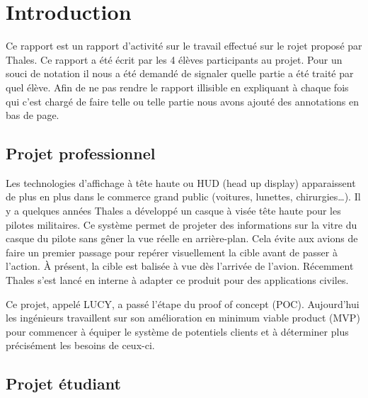 
\chapter{Introduction} %

\label{Chapter1} %


\color{red}

Ce rapport est un rapport d’activité sur le travail effectué sur le rojet proposé par Thales. Ce
rapport a été écrit par les 4 élèves participants au projet. Pour un souci de notation il nous a été
demandé de signaler quelle partie a été traité par quel élève. Afin de ne pas rendre le rapport
illisible en expliquant à chaque fois qui c’est chargé de faire telle ou telle partie nous avons ajouté
des annotations en bas de page.

\color{black}

\section{Projet professionnel}

Les technologies d’affichage à tête haute ou HUD (head up display) apparaissent de plus en plus dans le
commerce grand public (voitures, lunettes, chirurgies…). Il y a quelques années Thales a développé un
casque à visée tête haute pour les pilotes militaires. Ce système permet de projeter des informations
sur la vitre du casque du pilote sans gêner la vue réelle en arrière-plan. Cela évite aux avions de 
faire un premier passage pour repérer visuellement la cible avant de passer à l’action. À présent, la
cible est balisée à vue dès l’arrivée de l’avion. Récemment Thales s’est lancé en interne à adapter 
ce produit pour des applications civiles. \medskip

Ce projet, appelé LUCY, a passé l’étape du proof of concept (POC). Aujourd’hui les ingénieurs
travaillent sur son amélioration en minimum viable product (MVP) pour commencer à équiper le système
de potentiels clients et à déterminer plus précisément les besoins de ceux-ci. 

\section{Projet étudiant}

